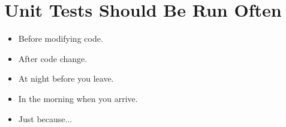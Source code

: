 \documentclass{article}
\begin{document}
\sloppy
\section{Unit Tests Should Be Run Often}
\begin{itemize}
    \item Before modifying code.
    \item After code change.
    \item At night before you leave.
    \item In the morning when you arrive.
    \item Just because...
\end{itemize}
\end{document}
